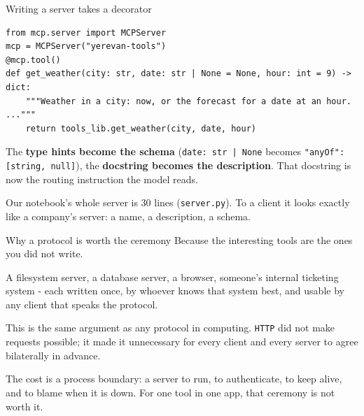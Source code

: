\documentclass[aspectratio=169]{beamer}
\newcommand{\takebox}[1]{%
  \begin{tcolorbox}[colback=paramgreen!8, colframe=paramgreen, boxrule=0.6pt, arc=2pt]
  #1
  \end{tcolorbox}}
\newcommand{\watchbox}[1]{%
  \begin{tcolorbox}[colback=armorange!12, colframe=armorange, boxrule=0.6pt, arc=2pt]
  #1
  \end{tcolorbox}}
\begin{document}
\begin{frame}[fragile]{Writing a server takes a decorator}
  \vspace{0.3em}
  \begin{lstlisting}
from mcp.server import MCPServer
mcp = MCPServer("yerevan-tools")
@mcp.tool()
def get_weather(city: str, date: str | None = None, hour: int = 9) -> dict:
    """Weather in a city: now, or the forecast for a date at an hour. ..."""
    return tools_lib.get_weather(city, date, hour)
\end{lstlisting}

  \vspace{0.2em}
  {\small The \textbf{type hints become the schema} (\texttt{date: str | None} becomes
  \texttt{"anyOf": [string, null]}), the \textbf{docstring becomes the description}. That docstring is now the
  routing instruction the model reads.}

  \vspace{0.4em}
  \takebox{\small Our notebook's whole server is 30 lines (\texttt{server.py}). To a client it looks exactly like
  a company's server: a name, a description, a schema.}
\end{frame}

\begin{frame}{Why a protocol is worth the ceremony}
  \vspace{0.35em}
  Because the interesting tools are the ones you did not write.

  \vspace{0.4em}
  A filesystem server, a database server, a browser, someone's internal ticketing system - each written once,
  by whoever knows that system best, and usable by any client that speaks the protocol.

  \vspace{0.45em}
  \takebox{This is the same argument as any protocol in computing. \texttt{HTTP} did not make requests possible;
  it made it unnecessary for every client and every server to agree bilaterally in advance.}

  \vspace{0.3em}
  \watchbox{The cost is a process boundary: a server to run, to authenticate, to keep alive, and to blame when
  it is down. For one tool in one app, that ceremony is not worth it.}
\end{frame}
\end{document}
